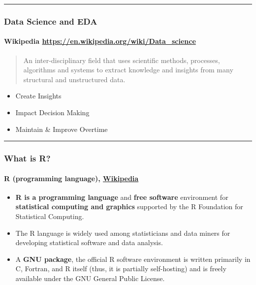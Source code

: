 \documentclass[
]{article}
\providecommand{\tightlist}{%
  \setlength{\itemsep}{0pt}\setlength{\parskip}{0pt}}
\begin{document}
\begin{center}\rule{0.5\linewidth}{0.5pt}\end{center}

\hypertarget{data-science-and-eda}{%
\subsubsection{Data Science and EDA}\label{data-science-and-eda}}

\hypertarget{wikipedia-httpsen.wikipedia.orgwikidata_science}{%
\paragraph{\texorpdfstring{Wikipedia
\url{https://en.wikipedia.org/wiki/Data_science}}{Wikipedia https://en.wikipedia.org/wiki/Data\_science}}\label{wikipedia-httpsen.wikipedia.orgwikidata_science}}

\begin{quote}
An inter-disciplinary field that uses scientific methods, processes,
algorithms and systems to extract knowledge and insights from many
structural and unstructured data.
\end{quote}

\begin{itemize}
\tightlist
\item
  Create Insights
\item
  Impact Decision Making
\item
  Maintain \& Improve Overtime
\end{itemize}

\begin{center}\rule{0.5\linewidth}{0.5pt}\end{center}

\hypertarget{what-is-r}{%
\subsubsection{What is R?}\label{what-is-r}}

\hypertarget{r-programming-language-wikipedia}{%
\paragraph{\texorpdfstring{R (programming language),
\href{https://en.wikipedia.org/wiki/R_(programming_language)}{Wikipedia}}{R (programming language), Wikipedia}}\label{r-programming-language-wikipedia}}

\begin{itemize}
\item
  \textbf{R is a programming language} and \textbf{free software}
  environment for \textbf{statistical computing and graphics} supported
  by the R Foundation for Statistical Computing.
\item
  The R language is widely used among statisticians and data miners for
  developing statistical software and data analysis.
\item
  A \textbf{GNU package}, the official R software environment is written
  primarily in C, Fortran, and R itself (thus, it is partially
  self-hosting) and is freely available under the GNU General Public
  License.
\end{itemize}
\end{document}
